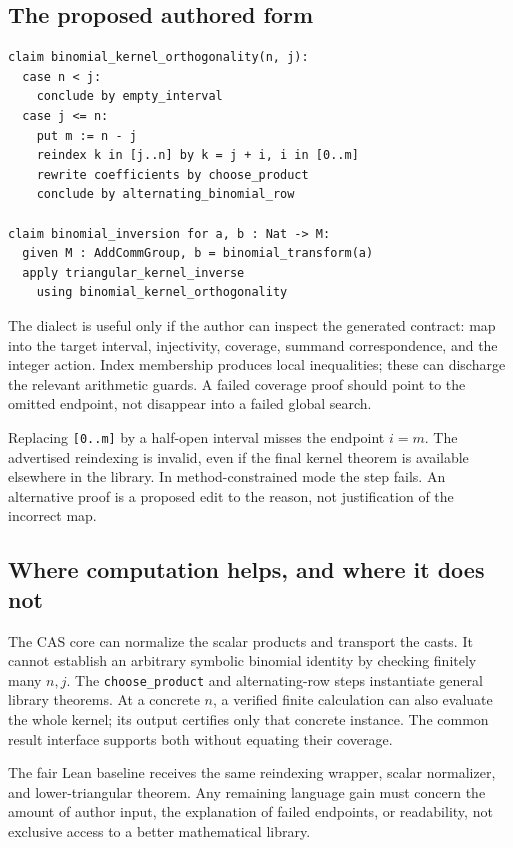 \documentclass[11pt,letterpaper]{article}
\newcommand{\code}[1]{\nolinkurl{#1}}
\numberwithin{equation}{section}
\begin{document}
\subsection{The proposed authored form}
\par\noindent\begin{minipage}{\linewidth}
\begin{lstlisting}
claim binomial_kernel_orthogonality(n, j):
  case n < j:
    conclude by empty_interval
  case j <= n:
    put m := n - j
    reindex k in [j..n] by k = j + i, i in [0..m]
    rewrite coefficients by choose_product
    conclude by alternating_binomial_row

claim binomial_inversion for a, b : Nat -> M:
  given M : AddCommGroup, b = binomial_transform(a)
  apply triangular_kernel_inverse
    using binomial_kernel_orthogonality
\end{lstlisting}
\end{minipage}\par


The dialect is useful only if the author can inspect the generated contract:
map into the target interval, injectivity, coverage, summand correspondence,
and the integer action. Index membership produces local inequalities; these
can discharge the relevant arithmetic guards. A failed coverage proof should
point to the omitted endpoint, not disappear into a failed global search.

Replacing \code{[0..m]} by a half-open interval misses the endpoint $i=m$.
The advertised reindexing is invalid, even if the final kernel theorem is
available elsewhere in the library. In method-constrained mode the step fails.
An alternative proof is a proposed edit to the reason, not justification of the
incorrect map.

\subsection{Where computation helps, and where it does not}
The CAS core can normalize the scalar products and transport the casts. It
cannot establish an arbitrary symbolic binomial identity by checking finitely
many $n,j$. The \code{choose_product} and alternating-row steps instantiate
general library theorems. At a concrete $n$, a verified finite calculation can
also evaluate the whole kernel; its output certifies only that concrete instance.
The common result interface supports both without equating their coverage.

The fair Lean baseline receives the same reindexing wrapper, scalar normalizer,
and lower-triangular theorem. Any remaining language gain must concern the
amount of author input, the explanation of failed endpoints, or readability,
not exclusive access to a better mathematical library.
\end{document}
